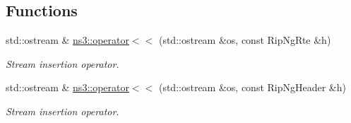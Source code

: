 \subsection*{Functions}
\begin{DoxyCompactItemize}
\item 
std\+::ostream \& \hyperlink{namespacens3_a1fc5a451063aa459751eac2c9f1c698a}{ns3\+::operator$<$$<$} (std\+::ostream \&os, const Rip\+Ng\+Rte \&h)
\begin{DoxyCompactList}\small\item\em Stream insertion operator. \end{DoxyCompactList}\item 
std\+::ostream \& \hyperlink{namespacens3_a94e52011ef89393f54e5a5c81d39d275}{ns3\+::operator$<$$<$} (std\+::ostream \&os, const Rip\+Ng\+Header \&h)
\begin{DoxyCompactList}\small\item\em Stream insertion operator. \end{DoxyCompactList}\end{DoxyCompactItemize}
